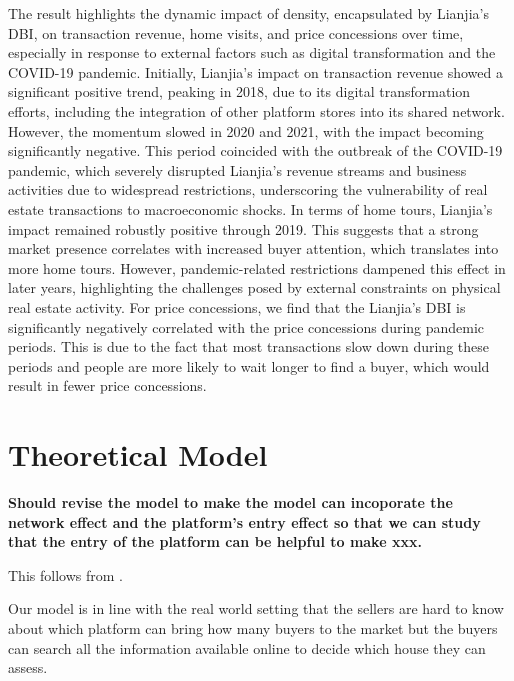 \documentclass[12pt]{article}
\begin{document}
The result highlights the dynamic impact of density, encapsulated by Lianjia's DBI, on transaction revenue, home visits, and price concessions over time, especially in response to external factors such as digital transformation and the COVID-19 pandemic. Initially, Lianjia's impact on transaction revenue showed a significant positive trend, peaking in 2018, due to its digital transformation efforts, including the integration of other platform stores into its shared network.  However, the momentum slowed in 2020 and 2021, with the impact becoming significantly negative. This period coincided with the outbreak of the COVID-19 pandemic, which severely disrupted Lianjia's revenue streams and business activities due to widespread restrictions, underscoring the vulnerability of real estate transactions to macroeconomic shocks. In terms of home tours, Lianjia's impact remained robustly positive through 2019. This suggests that a strong market presence correlates with increased buyer attention, which translates into more home tours. However, pandemic-related restrictions dampened this effect in later years, highlighting the challenges posed by external constraints on physical real estate activity. For price concessions, we find that the Lianjia's DBI is significantly negatively correlated with the price concessions during pandemic periods. This is due to the fact that most transactions slow down during these periods and people are more likely to wait longer to find a buyer, which would result in fewer price concessions.



\section{Theoretical Model} \label{sec:theoretical_model}

\textbf{Should revise the model to make the model can incoporate the network effect and the platform's entry effect so that we can study that the entry of the platform can be helpful to make xxx.}

This follows from \citep{Armstrong2006}.

Our model is in line with the real world setting that the sellers are hard to know about which platform can bring how many buyers to the market but the buyers can search all the information available online to decide which house they can assess.
\end{document}
